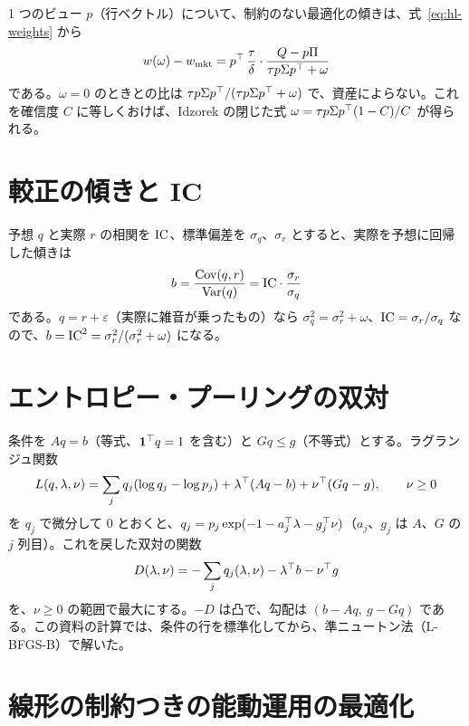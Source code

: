 1 つのビュー $p$（行ベクトル）について、制約のない最適化の傾きは、式~\eqref{eq:hl-weights} から
\begin{equation}
w(\omega)-w_{\mathrm{mkt}}=p^{\top}\,\frac{\tau}{\delta}\cdot\frac{Q-p\Pi}{\tau p\Sigma p^{\top}+\omega}
\end{equation}
である。$\omega=0$ のときとの比は $\tau p\Sigma p^{\top}/(\tau p\Sigma p^{\top}+\omega)$ で、資産によらない。これを確信度 $C$ に等しくおけば、Idzorek の閉じた式 $\omega=\tau p\Sigma p^{\top}(1-C)/C$ が得られる。

\section{較正の傾きと IC}

予想 $q$ と実際 $r$ の相関を $\mathrm{IC}$、標準偏差を $\sigma_q$、$\sigma_r$ とすると、実際を予想に回帰した傾きは
\begin{equation}
b=\frac{\mathrm{Cov}(q,r)}{\mathrm{Var}(q)}=\mathrm{IC}\cdot\frac{\sigma_r}{\sigma_q}
\end{equation}
である。$q=r+\varepsilon$（実際に雑音が乗ったもの）なら $\sigma_q^2=\sigma_r^2+\omega$、$\mathrm{IC}=\sigma_r/\sigma_q$ なので、$b=\mathrm{IC}^2=\sigma_r^2/(\sigma_r^2+\omega)$ になる。

\section{エントロピー・プーリングの双対}

条件を $Aq=b$（等式、$\mathbf{1}^{\top} q=1$ を含む）と $Gq\le g$（不等式）とする。ラグランジュ関数
\begin{equation}
L(q,\lambda,\nu)=\sum_jq_j(\log q_j-\log p_j)+\lambda^{\top}(Aq-b)+\nu^{\top}(Gq-g),\qquad\nu\ge0
\end{equation}
を $q_j$ で微分して 0 とおくと、$q_j=p_j\exp(-1-a_j^{\top}\lambda-g_j^{\top}\nu)$（$a_j$、$g_j$ は $A$、$G$ の $j$ 列目）。これを戻した双対の関数
\begin{equation}
D(\lambda,\nu)=-\sum_jq_j(\lambda,\nu)-\lambda^{\top} b-\nu^{\top} g
\end{equation}
を、$\nu\ge0$ の範囲で最大にする。$-D$ は凸で、勾配は $(b-Aq,\ g-Gq)$ である。この資料の計算では、条件の行を標準化してから、準ニュートン法（L-BFGS-B）で解いた。

\section{線形の制約つきの能動運用の最適化}

